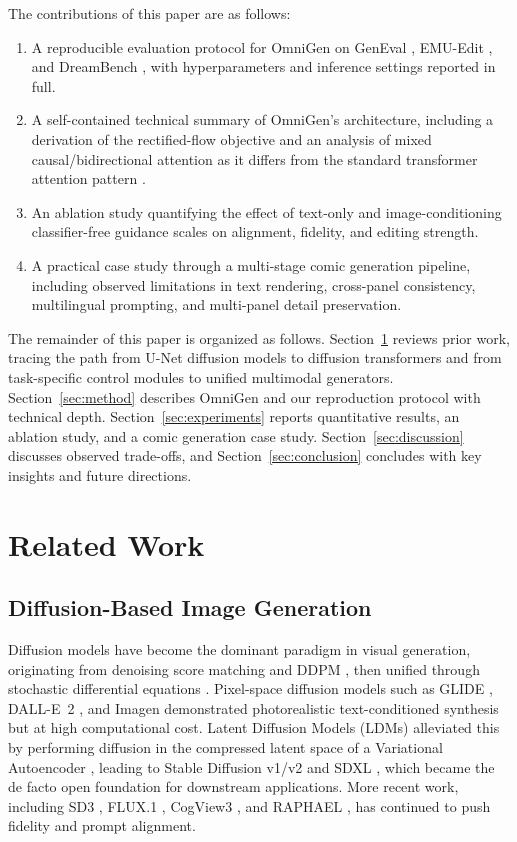 \documentclass[conference]{IEEEtran}
\begin{document}
The contributions of this paper are as follows:
\begin{enumerate}
    \item A reproducible evaluation protocol for OmniGen on GenEval \cite{geneval}, EMU-Edit \cite{emuedit}, and DreamBench \cite{dreambench}, with hyperparameters and inference settings reported in full.
    \item A self-contained technical summary of OmniGen's architecture, including a derivation of the rectified-flow objective and an analysis of mixed causal/bidirectional attention as it differs from the standard transformer attention pattern \cite{vaswani2017attention,peebles2023scalable}.
    \item An ablation study quantifying the effect of text-only and image-conditioning classifier-free guidance scales on alignment, fidelity, and editing strength.
    \item A practical case study through a multi-stage comic generation pipeline, including observed limitations in text rendering, cross-panel consistency, multilingual prompting, and multi-panel detail preservation.
\end{enumerate}

The remainder of this paper is organized as follows. Section~\ref{sec:related_work} reviews prior work, tracing the path from U-Net diffusion models to diffusion transformers and from task-specific control modules to unified multimodal generators. Section~\ref{sec:method} describes OmniGen and our reproduction protocol with technical depth. Section~\ref{sec:experiments} reports quantitative results, an ablation study, and a comic generation case study. Section~\ref{sec:discussion} discusses observed trade-offs, and Section~\ref{sec:conclusion} concludes with key insights and future directions.

\section{Related Work}
\label{sec:related_work}

\subsection{Diffusion-Based Image Generation}
Diffusion models have become the dominant paradigm in visual generation, originating from denoising score matching and DDPM \cite{ho2020denoising}, then unified through stochastic differential equations \cite{song2020score}. Pixel-space diffusion models such as GLIDE \cite{nichol2021glide}, DALL-E~2 \cite{ramesh2022hierarchical}, and Imagen \cite{saharia2022photorealistic} demonstrated photorealistic text-conditioned synthesis but at high computational cost. Latent Diffusion Models (LDMs) \cite{rombach2022high} alleviated this by performing diffusion in the compressed latent space of a Variational Autoencoder \cite{kingma2013auto}, leading to Stable Diffusion v1/v2 and SDXL \cite{podell2023sdxl}, which became the de facto open foundation for downstream applications. More recent work, including SD3 \cite{sd3}, FLUX.1 \cite{flux2024}, CogView3 \cite{cogview3}, and RAPHAEL \cite{xue2024raphael}, has continued to push fidelity and prompt alignment.
\end{document}
